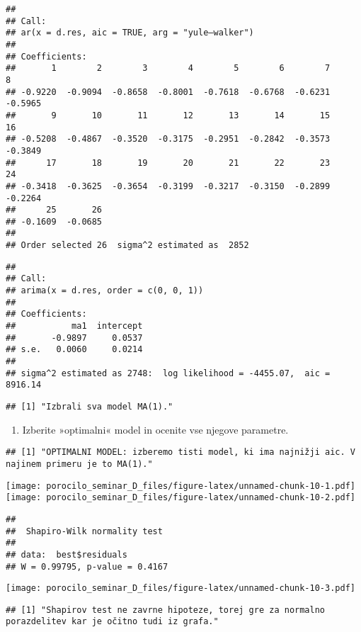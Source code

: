 \documentclass[
]{article}
\providecommand{\tightlist}{%
  \setlength{\itemsep}{0pt}\setlength{\parskip}{0pt}}
\begin{document}
\begin{verbatim}
## 
## Call:
## ar(x = d.res, aic = TRUE, arg = "yule–walker")
## 
## Coefficients:
##       1        2        3        4        5        6        7        8  
## -0.9220  -0.9094  -0.8658  -0.8001  -0.7618  -0.6768  -0.6231  -0.5965  
##       9       10       11       12       13       14       15       16  
## -0.5208  -0.4867  -0.3520  -0.3175  -0.2951  -0.2842  -0.3573  -0.3849  
##      17       18       19       20       21       22       23       24  
## -0.3418  -0.3625  -0.3654  -0.3199  -0.3217  -0.3150  -0.2899  -0.2264  
##      25       26  
## -0.1609  -0.0685  
## 
## Order selected 26  sigma^2 estimated as  2852
\end{verbatim}

\begin{verbatim}
## 
## Call:
## arima(x = d.res, order = c(0, 0, 1))
## 
## Coefficients:
##           ma1  intercept
##       -0.9897     0.0537
## s.e.   0.0060     0.0214
## 
## sigma^2 estimated as 2748:  log likelihood = -4455.07,  aic = 8916.14
\end{verbatim}

\begin{verbatim}
## [1] "Izbrali sva model MA(1)."
\end{verbatim}

\begin{enumerate}
\def\labelenumi{\arabic{enumi}.}
\setcounter{enumi}{5}
\tightlist
\item
  Izberite »optimalni« model in ocenite vse njegove parametre.
\end{enumerate}

\begin{verbatim}
## [1] "OPTIMALNI MODEL: izberemo tisti model, ki ima najnižji aic. V najinem primeru je to MA(1)."
\end{verbatim}

\texttt{[image: porocilo\_seminar\_D\_files/figure-latex/unnamed-chunk-10-1.pdf]}
\texttt{[image: porocilo\_seminar\_D\_files/figure-latex/unnamed-chunk-10-2.pdf]}

\begin{verbatim}
## 
##  Shapiro-Wilk normality test
## 
## data:  best$residuals
## W = 0.99795, p-value = 0.4167
\end{verbatim}

\texttt{[image: porocilo\_seminar\_D\_files/figure-latex/unnamed-chunk-10-3.pdf]}

\begin{verbatim}
## [1] "Shapirov test ne zavrne hipoteze, torej gre za normalno porazdelitev kar je očitno tudi iz grafa."
\end{verbatim}
\end{document}
